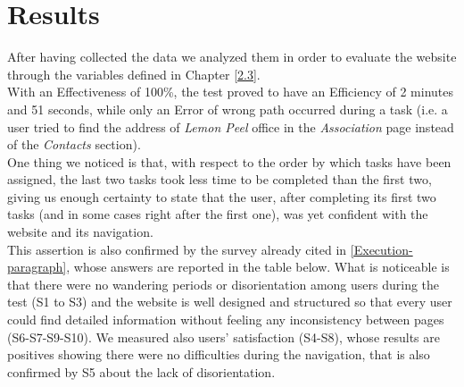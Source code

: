 \documentclass[../../UsabilityReport.tex]{subfiles}
\begin{document}
\section{Results}
	After having collected the data we analyzed them in order to evaluate the website through the variables defined in Chapter \ref{2.3}. \\
	
	With an Effectiveness of 100\%, the test proved to have an Efficiency of 2 minutes and 51 seconds, while only an Error of wrong path occurred during a task (i.e. a user tried to find the address of \textit{Lemon Peel} office in the \textit{Association} page instead of the \textit{Contacts} section). \\
	
	One thing we noticed is that, with respect to the order by which tasks have been assigned, the last two tasks took less time to be completed than the first two, giving us enough certainty to state that the user, after completing its first two tasks (and in some cases right after the first one), was yet confident with the website and its navigation. \\
	This assertion is also confirmed by the survey already cited in \ref{Execution-paragraph}, whose answers are reported in the table below. What is noticeable is that there were no wandering periods or disorientation among users during the test (S1 to S3)  and the website is well designed and structured so that every user could find detailed information without feeling any inconsistency between pages (S6-S7-S9-S10). We measured also users' satisfaction (S4-S8), whose results are positives showing there were no difficulties during the navigation, that is also confirmed by S5 about the lack of disorientation.
	
\end{document}
